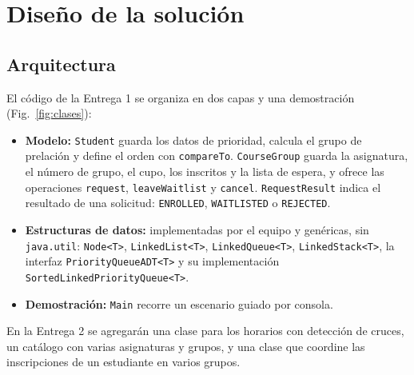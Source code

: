 \documentclass[conference]{IEEEtran}
\begin{document}

\section{Diseño de la solución}

\subsection{Arquitectura}
El código de la Entrega 1 se organiza en dos capas y una demostración (Fig.~\ref{fig:clases}):
\begin{itemize}
    \item \textbf{Modelo:} \texttt{Student} guarda los datos de prioridad, calcula el grupo de prelación y define el orden con \texttt{compareTo}. \texttt{CourseGroup} guarda la asignatura, el número de grupo, el cupo, los inscritos y la lista de espera, y ofrece las operaciones \texttt{request}, \texttt{leaveWaitlist} y \texttt{cancel}. \texttt{RequestResult} indica el resultado de una solicitud: \texttt{ENROLLED}, \texttt{WAITLISTED} o \texttt{REJECTED}.
    \item \textbf{Estructuras de datos:} implementadas por el equipo y genéricas, sin \texttt{java.util}: \texttt{Node<T>}, \texttt{LinkedList<T>}, \texttt{LinkedQueue<T>}, \texttt{LinkedStack<T>}, la interfaz \texttt{PriorityQueueADT<T>} y su implementación \texttt{SortedLinkedPriorityQueue<T>}.
    \item \textbf{Demostración:} \texttt{Main} recorre un escenario guiado por consola.
\end{itemize}
En la Entrega 2 se agregarán una clase para los horarios con detección de cruces, un catálogo con varias asignaturas y grupos, y una clase que coordine las inscripciones de un estudiante en varios grupos.
\end{document}
